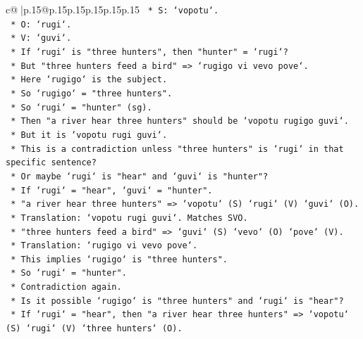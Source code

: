 \documentclass{article}
\begin{document}
{\begin{supertabular}{c@{$\;$}|p{.15\linewidth}@{}p{.15\linewidth}p{.15\linewidth}p{.15\linewidth}p{.15\linewidth}p{.15\linewidth}}
{{{\texttt{                        *   S: `vopotu`.} \\
\texttt{                        *   O: `rugi`.} \\
\texttt{                        *   V: `guvi`.} \\
\texttt{                        *   If `rugi` is "three hunters", then "hunter" = `rugi`?} \\
\texttt{                        *   But "three hunters feed a bird" => `rugigo vi vevo pove`.} \\
\texttt{                        *   Here `rugigo` is the subject.} \\
\texttt{                        *   So `rugigo` = "three hunters".} \\
\texttt{                        *   So `rugi` = "hunter" (sg).} \\
\texttt{                        *   Then "a river hear three hunters" should be `vopotu rugigo guvi`.} \\
\texttt{                        *   But it is `vopotu rugi guvi`.} \\
\texttt{                        *   This is a contradiction unless "three hunters" is `rugi` in that specific sentence?} \\
\texttt{                        *   Or maybe `rugi` is "hear" and `guvi` is "hunter"?} \\
\texttt{                        *   If `rugi` = "hear", `guvi` = "hunter".} \\
\texttt{                        *   "a river hear three hunters" => `vopotu` (S) `rugi` (V) `guvi` (O).} \\
\texttt{                        *   Translation: `vopotu rugi guvi`. Matches SVO.} \\
\texttt{                        *   "three hunters feed a bird" => `guvi` (S) `vevo` (O) `pove` (V).} \\
\texttt{                        *   Translation: `rugigo vi vevo pove`.} \\
\texttt{                        *   This implies `rugigo` is "three hunters".} \\
\texttt{                        *   So `rugi` = "hunter".} \\
\texttt{                        *   Contradiction again.} \\
\texttt{                        *   Is it possible `rugigo` is "three hunters" and `rugi` is "hear"?} \\
\texttt{                        *   If `rugi` = "hear", then "a river hear three hunters" => `vopotu` (S) `rugi` (V) `three hunters` (O).} \\
}}}
\end{supertabular}}
\end{document}
